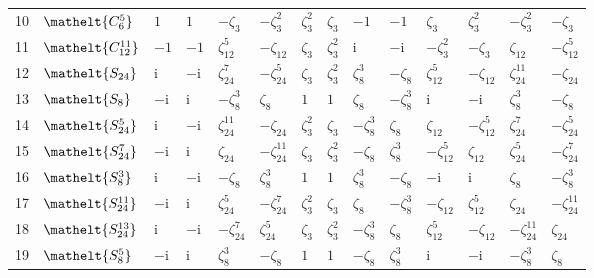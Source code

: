 \documentclass[10pt,a4paper]{article}
\numberwithin{equation}{section}
\newcommand{\eltfont}[1]{{\let\sigma\eltsigma\mathelt{#1}}}
\newcommand{\cls}[1]{\eltfont{#1}}
\newcommand{\iunit}{\mathrm{i}}
\newcommand{\rootunity}[1]{\zeta_{#1}}
\begin{document}
{\begin{longtable}{@{}rlllllllllllll@{}}
10 & $\cls{C_{6}^{5}}$ & $1$ & $1$ & $-\rootunity{3}$ & $-\rootunity{3}^{2}$ & $\rootunity{3}^{2}$ & $\rootunity{3}$ & $-1$ & $-1$ & $\rootunity{3}$ & $\rootunity{3}^{2}$ & $-\rootunity{3}^{2}$ & $-\rootunity{3}$\\
11 & $\cls{C_{12}^{11}}$ & $-1$ & $-1$ & $\rootunity{12}^{5}$ & $-\rootunity{12}$ & $\rootunity{3}$ & $\rootunity{3}^{2}$ & $\iunit{}$ & $-\iunit{}$ & $-\rootunity{3}^{2}$ & $-\rootunity{3}$ & $\rootunity{12}$ & $-\rootunity{12}^{5}$\\
12 & $\cls{S_{24}}$ & $\iunit{}$ & $-\iunit{}$ & $\rootunity{24}^{7}$ & $-\rootunity{24}^{5}$ & $\rootunity{3}$ & $\rootunity{3}^{2}$ & $\rootunity{8}^{3}$ & $-\rootunity{8}$ & $\rootunity{12}^{5}$ & $-\rootunity{12}$ & $\rootunity{24}^{11}$ & $-\rootunity{24}$\\
13 & $\cls{S_{8}}$ & $-\iunit{}$ & $\iunit{}$ & $-\rootunity{8}^{3}$ & $\rootunity{8}$ & $1$ & $1$ & $\rootunity{8}$ & $-\rootunity{8}^{3}$ & $\iunit{}$ & $-\iunit{}$ & $\rootunity{8}^{3}$ & $-\rootunity{8}$\\
14 & $\cls{S_{24}^{5}}$ & $\iunit{}$ & $-\iunit{}$ & $\rootunity{24}^{11}$ & $-\rootunity{24}$ & $\rootunity{3}^{2}$ & $\rootunity{3}$ & $-\rootunity{8}^{3}$ & $\rootunity{8}$ & $\rootunity{12}$ & $-\rootunity{12}^{5}$ & $\rootunity{24}^{7}$ & $-\rootunity{24}^{5}$\\
15 & $\cls{S_{24}^{7}}$ & $-\iunit{}$ & $\iunit{}$ & $\rootunity{24}$ & $-\rootunity{24}^{11}$ & $\rootunity{3}$ & $\rootunity{3}^{2}$ & $-\rootunity{8}$ & $\rootunity{8}^{3}$ & $-\rootunity{12}^{5}$ & $\rootunity{12}$ & $\rootunity{24}^{5}$ & $-\rootunity{24}^{7}$\\
16 & $\cls{S_{8}^{3}}$ & $\iunit{}$ & $-\iunit{}$ & $-\rootunity{8}$ & $\rootunity{8}^{3}$ & $1$ & $1$ & $\rootunity{8}^{3}$ & $-\rootunity{8}$ & $-\iunit{}$ & $\iunit{}$ & $\rootunity{8}$ & $-\rootunity{8}^{3}$\\
17 & $\cls{S_{24}^{11}}$ & $-\iunit{}$ & $\iunit{}$ & $\rootunity{24}^{5}$ & $-\rootunity{24}^{7}$ & $\rootunity{3}^{2}$ & $\rootunity{3}$ & $\rootunity{8}$ & $-\rootunity{8}^{3}$ & $-\rootunity{12}$ & $\rootunity{12}^{5}$ & $\rootunity{24}$ & $-\rootunity{24}^{11}$\\
18 & $\cls{S_{24}^{13}}$ & $\iunit{}$ & $-\iunit{}$ & $-\rootunity{24}^{7}$ & $\rootunity{24}^{5}$ & $\rootunity{3}$ & $\rootunity{3}^{2}$ & $-\rootunity{8}^{3}$ & $\rootunity{8}$ & $\rootunity{12}^{5}$ & $-\rootunity{12}$ & $-\rootunity{24}^{11}$ & $\rootunity{24}$\\
19 & $\cls{S_{8}^{5}}$ & $-\iunit{}$ & $\iunit{}$ & $\rootunity{8}^{3}$ & $-\rootunity{8}$ & $1$ & $1$ & $-\rootunity{8}$ & $\rootunity{8}^{3}$ & $\iunit{}$ & $-\iunit{}$ & $-\rootunity{8}^{3}$ & $\rootunity{8}$\\

\end{longtable}}
\end{document}
